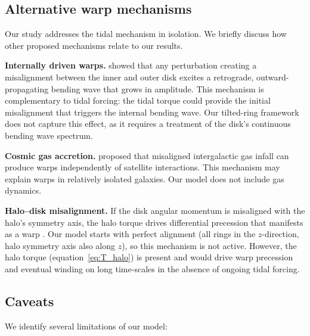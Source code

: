 \subsection{Alternative warp mechanisms}
\label{sec:alternatives}

Our study addresses the tidal mechanism in isolation. We briefly discuss how other proposed mechanisms relate to our results.

\textbf{Internally driven warps.} \citet{sellwood2022} showed that any perturbation creating a misalignment between the inner and outer disk excites a retrograde, outward-propagating bending wave that grows in amplitude. This mechanism is complementary to tidal forcing: the tidal torque could provide the initial misalignment that triggers the internal bending wave. Our tilted-ring framework does not capture this effect, as it requires a treatment of the disk's continuous bending wave spectrum.

\textbf{Cosmic gas accretion.} \citet{lopezcorredoira2002} proposed that misaligned intergalactic gas infall can produce warps independently of satellite interactions. This mechanism may explain warps in relatively isolated galaxies. Our model does not include gas dynamics.

\textbf{Halo--disk misalignment.} If the disk angular momentum is misaligned with the halo's symmetry axis, the halo torque drives differential precession that manifests as a warp \citep{debattista1999}. Our model starts with perfect alignment (all rings in the $z$-direction, halo symmetry axis also along $z$), so this mechanism is not active. However, the halo torque (equation~\ref{eq:T_halo}) is present and would drive warp precession and eventual winding on long time-scales in the absence of ongoing tidal forcing.

\subsection{Caveats}
\label{sec:caveats}

We identify several limitations of our model:


